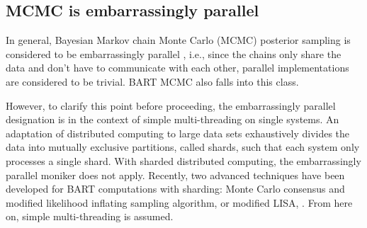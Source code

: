 \documentclass[article]{jss}
\begin{document}
\subsection{MCMC is embarrassingly parallel}

In general, Bayesian Markov chain Monte Carlo (MCMC) posterior
sampling is considered to be embarrassingly parallel
\citep{RossTier07}, i.e., since the chains only share the data and
don't have to communicate with each other, parallel implementations
are considered to be trivial.  BART MCMC also falls into this class.

However, to clarify this point before proceeding, the embarrassingly
parallel designation is in the context of simple multi-threading on
single systems.  An adaptation of distributed computing to large data
sets exhaustively divides the data into mutually exclusive partitions,
called shards, such that each system only processes a single shard.
With sharded distributed computing, the embarrassingly parallel moniker
does not apply.  Recently, two advanced techniques have been developed
for BART computations with sharding: Monte Carlo consensus
\citep{PratChip14} and modified likelihood inflating sampling
algorithm, or modified LISA, \citep{EnteCrai18}.  From here on, simple
multi-threading is assumed.
\end{document}
